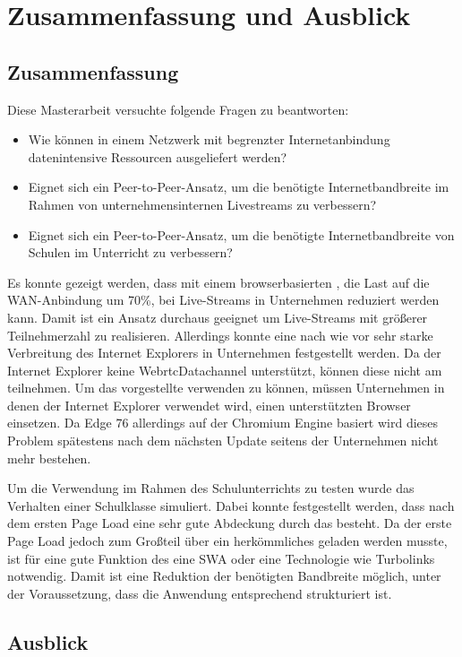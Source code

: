\chapter{Zusammenfassung und Ausblick}
\section{Zusammenfassung}

Diese Masterarbeit versuchte folgende Fragen zu beantworten:
\begin{itemize}
	\item Wie können in einem Netzwerk mit begrenzter Internetanbindung datenintensive Ressourcen ausgeliefert werden?
	\item Eignet sich ein Peer-to-Peer-Ansatz, um die benötigte Internetbandbreite im Rahmen von unternehmensinternen Livestreams zu verbessern?
	\item Eignet sich ein Peer-to-Peer-Ansatz, um die benötigte Internetbandbreite von Schulen im Unterricht zu verbessern?
\end{itemize}

Es konnte gezeigt werden, dass mit einem browserbasierten \cdn, die Last auf die WAN-Anbindung um 70\%, bei Live-Streams in Unternehmen reduziert werden kann. Damit ist ein \pTp Ansatz durchaus geeignet um Live-Streams mit größerer Teilnehmerzahl zu realisieren. Allerdings konnte eine nach wie vor sehr starke Verbreitung des Internet Explorers in Unternehmen festgestellt werden. Da der Internet Explorer keine WebrtcDatachannel unterstützt, können diese nicht am \pTp \cdn teilnehmen. Um das vorgestellte \cdn verwenden zu können, müssen Unternehmen in denen der Internet Explorer verwendet wird, einen unterstützten Browser einsetzen. Da Edge 76 allerdings auf der Chromium Engine basiert wird dieses Problem spätestens nach dem nächsten Update seitens der Unternehmen nicht mehr bestehen. 

Um die Verwendung im Rahmen des Schulunterrichts zu testen wurde das Verhalten einer Schulklasse simuliert. Dabei konnte festgestellt werden, dass nach dem ersten Page Load eine sehr gute Abdeckung durch das \pTp \cdn besteht. Da der erste Page Load jedoch zum Großteil über ein herkömmliches \cdn geladen werden musste, ist für eine gute Funktion des \pTp \cdns eine SWA oder eine Technologie wie Turbolinks notwendig. Damit ist eine Reduktion der benötigten Bandbreite möglich, unter der Voraussetzung, dass die Anwendung entsprechend strukturiert ist. 

\section{Ausblick}

